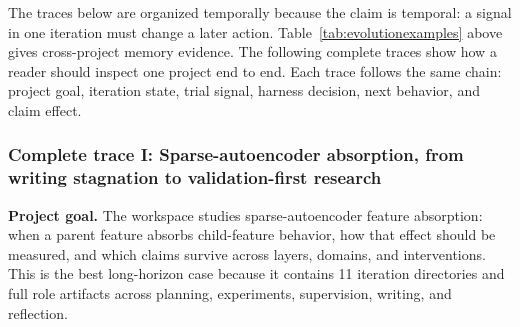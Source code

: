 \documentclass{article}
\begin{document}
The traces below are organized temporally because the claim is temporal: a signal in one iteration must change a later action. Table~\ref{tab:evolutionexamples} above gives cross-project memory evidence. The following complete traces show how a reader should inspect one project end to end. Each trace follows the same chain: project goal, iteration state, trial signal, harness decision, next behavior, and claim effect.

\subsubsection{Complete trace I: Sparse-autoencoder absorption, from writing stagnation to validation-first research}

\textbf{Project goal.} The workspace studies sparse-autoencoder feature absorption: when a parent feature absorbs child-feature behavior, how that effect should be measured, and which claims survive across layers, domains, and interventions. This is the best long-horizon case because it contains 11 iteration directories and full role artifacts across planning, experiments, supervision, writing, and reflection.
\end{document}
